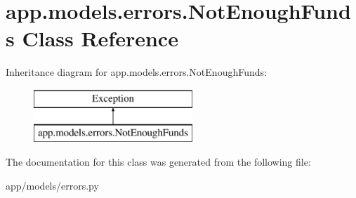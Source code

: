 \hypertarget{classapp_1_1models_1_1errors_1_1_not_enough_funds}{}\section{app.\+models.\+errors.\+Not\+Enough\+Funds Class Reference}
\label{classapp_1_1models_1_1errors_1_1_not_enough_funds}
Inheritance diagram for app.\+models.\+errors.\+Not\+Enough\+Funds\+:\begin{figure}[H]
\begin{center}
\leavevmode
\includegraphics[height=2.000000cm]{classapp_1_1models_1_1errors_1_1_not_enough_funds}
\end{center}
\end{figure}


The documentation for this class was generated from the following file\+:\begin{DoxyCompactItemize}
\item 
app/models/errors.\+py\end{DoxyCompactItemize}
